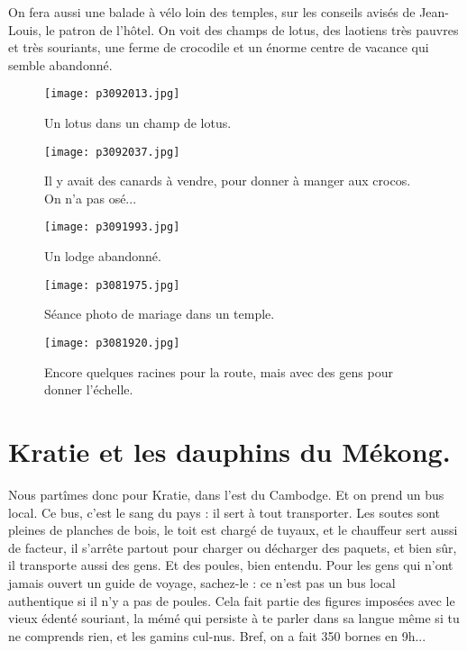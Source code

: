 \documentclass{book}
\begin{document}
On fera aussi une balade à vélo loin des temples, sur les conseils avisés de Jean-Louis, le patron de l'hôtel. On voit des champs de lotus, des laotiens très pauvres et très souriants, une ferme de crocodile et un énorme centre de vacance qui semble abandonné.


\begin{figure}[h]
\centering
\texttt{[image: p3092013.jpg]}
\caption*{Un lotus dans un champ de lotus.}
\end{figure}


\begin{figure}[h]
\centering
\texttt{[image: p3092037.jpg]}
\caption*{Il y avait des canards à vendre, pour donner à manger aux crocos. On n'a pas osé...}
\end{figure}


\begin{figure}[h]
\centering
\texttt{[image: p3091993.jpg]}
\caption*{Un lodge abandonné.}
\end{figure}


\begin{figure}[h]
\centering
\texttt{[image: p3081975.jpg]}
\caption*{Séance photo de mariage dans un temple.}
\end{figure}


\begin{figure}[h]
\centering
\texttt{[image: p3081920.jpg]}
\caption*{Encore quelques racines pour la route, mais avec des gens pour donner l'échelle.}
\end{figure}



\chapter{Kratie et les dauphins du Mékong.}
Nous partîmes donc pour Kratie, dans l'est du Cambodge. Et on prend un bus local. Ce bus, c'est le sang du pays : il sert à tout transporter. Les soutes sont pleines de planches de bois, le toit est chargé de tuyaux, et le chauffeur sert aussi de facteur, il s'arrête partout pour charger ou décharger des paquets, et bien sûr, il transporte aussi des gens. Et des poules, bien entendu. Pour les gens qui n'ont jamais ouvert un guide de voyage, sachez-le : ce n'est pas un bus local authentique si il n'y a pas de poules. Cela fait partie des figures imposées avec le vieux édenté souriant, la mémé qui persiste à te parler dans sa langue même si tu ne comprends rien, et les gamins cul-nus. Bref, on a fait 350 bornes en 9h...
\end{document}
